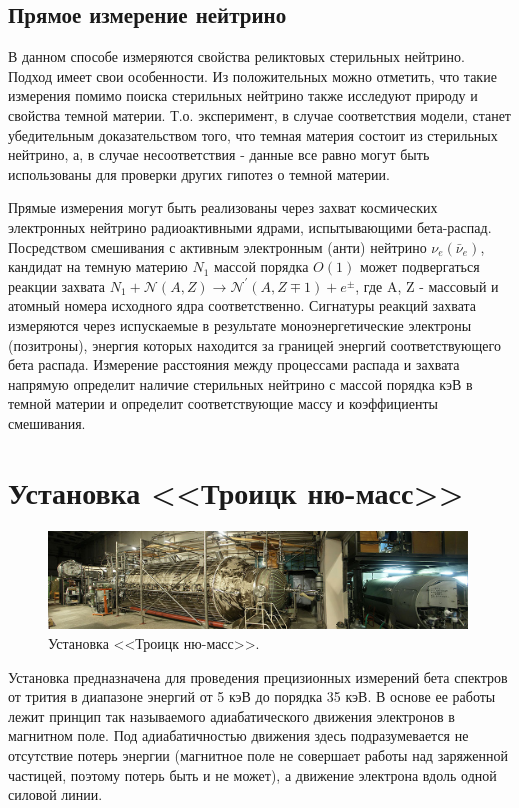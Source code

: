 \documentclass[a4paper,14pt]{extreport}
\begin{document}
\section{Прямое измерение нейтрино}
В данном способе измеряются свойства реликтовых стерильных нейтрино. Подход имеет свои особенности. Из положительных можно отметить, что такие измерения помимо поиска стерильных нейтрино также исследуют природу и свойства темной материи. Т.о. эксперимент, в случае соответствия модели, станет убедительным доказательством того, что темная материя состоит из стерильных нейтрино, а, в случае несоответствия - данные все равно могут быть использованы для проверки других гипотез о темной материи.

Прямые измерения могут быть реализованы через захват космических электронных нейтрино радиоактивными ядрами, испытывающими бета-распад\cite{1005.3351}\cite{1009.5870}. Посредством смешивания с активным электронным (анти) нейтрино $\nu_e (\bar{\nu}_{e})$, кандидат на темную материю $ {N}^{}_{1} $ массой порядка $O(1)$ может подвергаться реакции захвата $ {N}^{}_{1} + \mathcal{N}(A,Z) \to \mathcal{N}^\prime (A, Z\mp1) + e^{\pm} $, где A, Z - массовый и атомный номера исходного ядра соответственно. Сигнатуры реакций захвата измеряются через испускаемые в результате моноэнергетические электроны (позитроны), энергия которых находится за границей энергий соответствующего бета распада. Измерение расстояния между процессами распада и захвата напрямую определит наличие стерильных нейтрино с массой порядка кэВ в темной материи и определит соответствующие массу и коэффициенты смешивания.

\chapter{Установка <<Троицк ню-масс>>}
\begin{figure}
  \centering
  \includegraphics[width = 0.99\textwidth]{img/nu_mass_setup/setup.jpg}
    \caption{Установка <<Троицк ню-масс>>.}
    \label{fig:numass-photo}
\end{figure}
Установка предназначена для проведения прецизионных измерений бета спектров от трития в диапазоне энергий от 5 кэВ до порядка 35 кэВ. В основе ее работы лежит 
принцип так называемого адиабатического движения электронов в магнитном поле. Под адиабатичностью движения здесь подразумевается не отсутствие потерь энергии (магнитное поле не совершает работы над заряженной частицей, поэтому потерь быть и не может), а движение электрона вдоль одной силовой линии.
\end{document}
